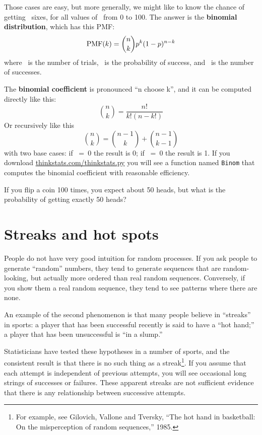\documentclass[12pt]{book}
\begin{document}
Those cases are easy, but more generally, we might like to know the
chance of getting \kk~sixes, for all values of \kk~from 0 to 100.  The
answer is the {\bf binomial distribution}, which has this PMF:
%
\[ \mathrm{PMF}(k) = \binom{n}{k} p^k (1-p)^{n-k}\]
%
where \n~is the number of trials, \p~is the probability of success,
and \kk~is the number of successes.

The {\bf binomial coefficient} is pronounced ``n choose k'', and it
can be computed directly like this:
%
\[ \binom{n}{k} = \frac{n!}{k!(n-k!)}  \]
%
Or recursively like this
%
\[ \binom{n}{k} = \binom{n-1}{k} + \binom{n-1}{k-1} \]
%
with two base cases: if \n~=~0 the result is 0; if \kk~=~0 the result is 1.
If you download \url{thinkstats.com/thinkstats.py} you will see a function
named {\tt Binom} that computes the binomial coefficient with reasonable
efficiency.

\begin{exercise}
If you flip a coin 100 times, you expect about 50 heads, but what
is the probability of getting exactly 50 heads?


\end{exercise}


\section{Streaks and hot spots}

People do not have very good intuition for random processes.  If you
ask people to generate ``random'' numbers, they tend to generate
sequences that are random-looking, but actually more ordered than real
random sequences.  Conversely, if you show them a real random
sequence, they tend to see patterns where there are none.

An example of the second phenomenon is that many people believe
in ``streaks'' in sports: a player that has been successful recently
is said to have a ``hot hand;'' a player that has been unsuccessful is
``in a slump.''

Statisticians have tested these hypotheses in a number of sports, and
the consistent result is that there is no such thing as a
streak\footnote{For example, see Gilovich, Vallone and Tversky, ``The
  hot hand in basketball: On the misperception of random sequences,''
  1985.}.  If you assume that each attempt is independent of previous
attempts, you will see occasional long strings of successes or
failures.  These apparent streaks are not sufficient evidence that
there is any relationship between successive attempts.
\end{document}
